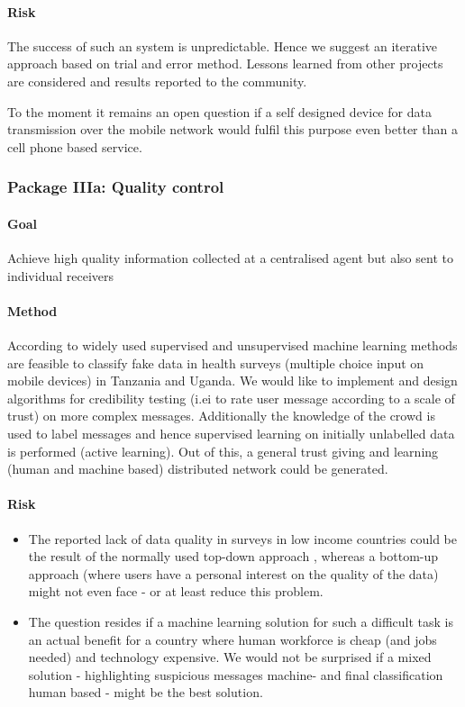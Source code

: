\documentclass[11pt]{article}
\begin{document}
\paragraph{Risk} The success of such an system is unpredictable. Hence we suggest an iterative approach based on trial and error method. Lessons learned from other projects are considered and results reported to the community.

To the moment it remains an open question if a self designed device for data transmission over the mobile network would fulfil this purpose even better than a cell phone based service. 




\subsubsection*{Package IIIa: Quality control}
\paragraph{Goal} Achieve high quality information collected at a centralised agent but also sent to individual receivers 
\paragraph{Method} According to \citep{birnbaum2012automated} widely used supervised and unsupervised machine learning methods are feasible to classify fake data in health surveys (multiple choice input on mobile devices) in Tanzania and Uganda. We would like to implement and design algorithms for credibility testing (i.ei to rate user message according to a scale of trust) on more complex messages. Additionally the knowledge of the crowd is used to label messages and hence supervised learning on initially unlabelled data is performed (active learning). Out of this, a general trust giving and learning (human and machine based) distributed network could be generated.

\paragraph{Risk}

\begin{itemize}
 \item The reported lack of data quality in surveys in low income countries could be the result of the normally used top-down approach \citep{birnbaum2012automated}, whereas a bottom-up approach  (where users have a personal interest on the quality of the data) might not even face - or at least reduce this problem.
 \item The question resides if a machine learning solution for such a difficult task is an actual benefit for a country where human workforce is cheap (and jobs needed) and technology expensive. We would not be surprised if a mixed solution - highlighting suspicious messages machine- and final classification human based - might be the best solution.
\end{itemize}
\end{document}
